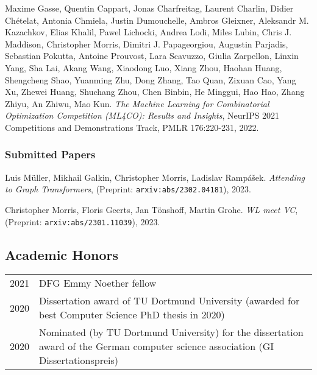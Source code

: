\documentclass[10pt, a4paper, DIV=14, headings=small]{scrartcl}
\begin{document}
\begin{thebibliography}{15}
	Maxime Gasse, Quentin Cappart, Jonas Charfreitag, Laurent Charlin, Didier Chételat, Antonia Chmiela, Justin Dumouchelle, Ambros Gleixner, Aleksandr M. Kazachkov, Elias Khalil, Pawel Lichocki, Andrea Lodi, Miles Lubin, Chris J. Maddison, Christopher Morris, Dimitri J. Papageorgiou, Augustin Parjadis, Sebastian Pokutta, Antoine Prouvost, Lara Scavuzzo, Giulia Zarpellon, Linxin Yang, Sha Lai, Akang Wang, Xiaodong Luo, Xiang Zhou, Haohan Huang, Shengcheng Shao, Yuanming Zhu, Dong Zhang, Tao Quan, Zixuan Cao, Yang Xu, Zhewei Huang, Shuchang Zhou, Chen Binbin, He Minggui, Hao Hao, Zhang Zhiyu, An Zhiwu, Mao Kun.
	\emph{The Machine Learning for Combinatorial Optimization Competition (ML4CO): Results and Insights}, NeurIPS 2021 Competitions and Demonstrations Track, PMLR 176:220-231, 2022.

	\subsubsection*{Submitted Papers}

	Luis Müller, Mikhail Galkin, Christopher Morris, Ladislav Rampášek.
	\emph{Attending to Graph Transformers}, (Preprint: \texttt{arxiv:abs/2302.04181}), 2023.

	Christopher Morris, Floris Geerts, Jan Tönshoff, Martin Grohe.
	\emph{WL meet VC}, (Preprint: \texttt{arxiv:abs/2301.11039}), 2023.
\end{thebibliography}

\subsection*{Academic Honors}
 \tabulinesep=0.8mm
\begin{longtabu}{p{2.1cm}p{12.0cm}}
	2021 & DFG Emmy Noether fellow                                                                                                             \\
	2020 & Dissertation award of TU Dortmund University (awarded for best Computer Science PhD thesis in 2020)                                 \\
	2020 & Nominated (by TU Dortmund University) for the dissertation award of the German computer science association (GI Dissertationspreis) \\
\end{longtabu}
\end{document}
